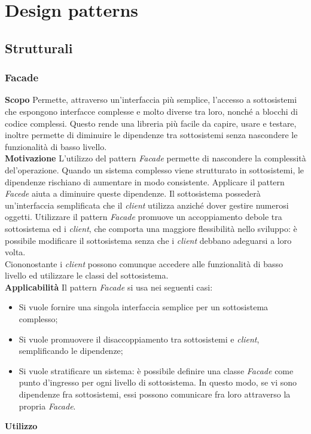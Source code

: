 \newpage
\section{Design patterns}

\subsection{Strutturali}
\subsubsection{Facade}
\textbf{Scopo}	Permette, attraverso un'interfaccia più semplice, l'accesso a sottosistemi che espongono interfacce complesse e molto diverse tra loro, nonché a blocchi di codice complessi. Questo rende una libreria più facile da capire, usare e testare, inoltre permette di diminuire le dipendenze tra sottosistemi senza nascondere le funzionalità di basso livello.
\\
\textbf{Motivazione}	L'utilizzo del pattern \textit{Facade} permette di nascondere la complessità del'operazione. Quando un sistema complesso viene strutturato in sottosistemi, le dipendenze rischiano di aumentare in modo consistente. Applicare il pattern \textit{Facede} aiuta a diminuire queste dipendenze. Il sottosistema possederà un'interfaccia semplificata che il \textit{client} utilizza anziché dover gestire numerosi oggetti. Utilizzare il pattern \textit{Facade} promuove un accoppiamento debole tra sottosistema ed i \textit{client}, che comporta una maggiore flessibilità nello sviluppo: è possibile modificare il sottosistema senza che i \textit{client} debbano adeguarsi a loro volta. \\
Ciononostante i \textit{client} possono comunque accedere alle funzionalità di basso livello ed utilizzare le classi del sottosistema.
\\
\textbf{Applicabilità}	Il pattern \textit{Facade} si usa nei seguenti casi:
	\begin{itemize}
		\item Si vuole fornire una singola interfaccia semplice per un sottosistema complesso;
		\item Si vuole promuovere il disaccoppiamento tra sottosistemi e \textit{client}, semplificando le dipendenze;
		\item Si vuole stratificare un sistema: è possibile definire una classe \textit{Facade} come punto d'ingresso per ogni livello di sottosistema. In questo modo, se vi sono dipendenze fra sottosistemi, essi possono comunicare fra loro attraverso la propria \textit{Facade}.
	\end{itemize}
\textbf{Utilizzo}

